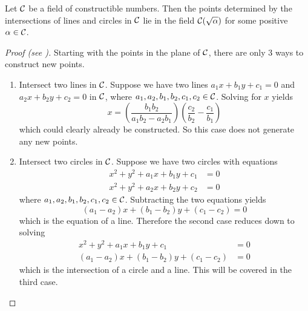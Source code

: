 \begin{lemma}
    Let $\mathcal{C}$ be a field of constructible numbers. Then the points determined by the intersections of lines and circles in $\mathcal{C}$ lie in the field $\mathcal{C}(\sqrt{\alpha})$ for some positive $\alpha \in \mathcal{C}$.
\end{lemma}
\begin{proof}[Proof (see {\cite[pp.~272-273]{judson_beezer_2022}})]
    Starting with the points in the plane of $\mathcal{C}$, there are only 3 ways to construct new points.
    \begin{enumerate}
        \item Intersect two lines in $\mathcal{C}$. Suppose we have two lines $a_1x + b_1y + c_1 = 0$ and $a_2x + b_2y + c_2 = 0$ in $\mathcal{C}$, where $a_1,a_2,b_1,b_2,c_1,c_2 \in \mathcal{C}$. Solving for $x$ yields
        \[
            x = \left(\frac{b_1b_2}{a_1b_2-a_2b_1}\right)\left(\frac{c_2}{b_2}-\frac{c_1}{b_1}\right)
        \]
        which could clearly already be constructed. So this case does not generate any new points.

        \item Intersect two circles in $\mathcal{C}$. Suppose we have two circles with equations
        \begin{align*}
            x^2 + y^2 + a_1x + b_1y + c_1 &= 0\\
            x^2 + y^2 + a_2x + b_2y + c_2 &= 0
        \end{align*}
        where $a_1,a_2,b_1,b_2,c_1,c_2 \in \mathcal{C}$. Subtracting the two equations yields
        \[
            (a_1-a_2)x + (b_1-b_2)y + (c_1-c_2) = 0
        \]
        which is the equation of a line. Therefore the second case reduces down to solving
        \begin{align*}
            x^2 + y^2 + a_1x + b_1y + c_1 &= 0\\
            (a_1-a_2)x + (b_1-b_2)y + (c_1-c_2) &= 0
        \end{align*}
        which is the intersection of a circle and a line. This will be covered in the third case.


\end{enumerate}
\end{proof}
